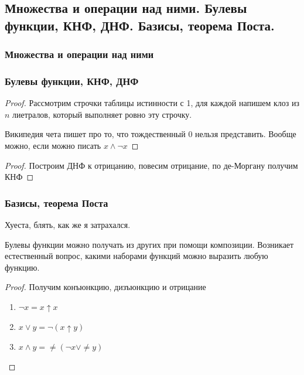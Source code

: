 \subsection{Множества и операции над ними. Булевы функции, КНФ, ДНФ. Базисы, теорема Поста.}

\subsubsection{Множества и операции над ними}

\subsubsection{Булевы функции, КНФ, ДНФ}
\begin{proof}
	Рассмотрим строчки таблицы истинности с 1, для каждой напишем клоз из $n$ лиетралов, который выполняет ровно эту строчку.
	
	Википедия чета пишет про то, что тождественный 0 нельзя представить. Вообще можно, если можно писать $x \wedge \neg x$
\end{proof}

\begin{proof}
	Построим ДНФ к отрицанию, повесим отрицание, по де-Моргану получим КНФ 
\end{proof}

\subsubsection{Базисы, теорема Поста}

Хуеста, блять, как же я затрахался. 

Булевы функции можно получать из других при помощи композиции. Возникает естественный вопрос, какими наборами функций можно выразить любую функцию.

\begin{proof}
	Получим конъюнкцию, дизъюнкцию и отрицание
	\begin{enumerate}
		\item $\neg x = x \uparrow x$
		\item $x \vee y = \neg (x \uparrow y)$
		\item $x \wedge y = \neq (\neg x \vee \neq y)$
	\end{enumerate}
\end{proof}

